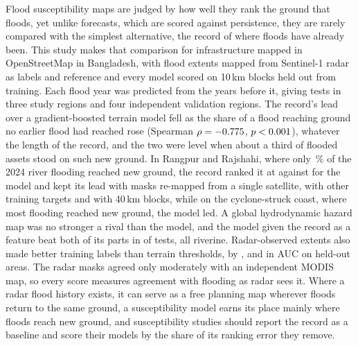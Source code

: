 Flood susceptibility maps are judged by how well they rank the ground that floods, yet unlike forecasts, which are scored against persistence, they are rarely compared with the simplest alternative, the record of where floods have already been. This study makes that comparison for infrastructure mapped in OpenStreetMap in Bangladesh, with flood extents mapped from Sentinel-1 radar as labels and reference and every model scored on 10\,km blocks held out from training. Each flood year was predicted from the years before it, giving \PoolTests{} tests in three study regions and four independent validation regions. The record's lead over a gradient-boosted terrain model fell as the share of a flood reaching ground no earlier flood had reached rose (Spearman $\rho=-0.775{}$, $p<0.001{}$), whatever the length of the record, and the two were level when about a third of flooded assets stood on such new ground. In Rangpur and Rajshahi, where only \RRRollTwentyFourNewGround{}\,\% of the 2024 river flooding reached new ground, the record ranked it at \RRTempPastAUC{} against \RRTempAUC{} for the model and kept its lead with masks re-mapped from a single satellite, with other training targets and with 40\,km blocks, while on the cyclone-struck coast, where most flooding reached new ground, the model led. A global hydrodynamic hazard map was no stronger a rival than the model, and the model given the record as a feature beat both of its parts in \CombinedAheadBoth{} of \CombinedTests{} tests, all riverine. Radar-observed extents also made better training labels than terrain thresholds, by \RRLabelGap{}, \SylhetLabelGap{} and \CoastalLabelGap{} in AUC on held-out areas. The radar masks agreed only moderately with an independent MODIS map, so every score measures agreement with flooding as radar sees it. Where a radar flood history exists, it can serve as a free planning map wherever floods return to the same ground, a susceptibility model earns its place mainly where floods reach new ground, and susceptibility studies should report the record as a baseline and score their models by the share of its ranking error they remove.
